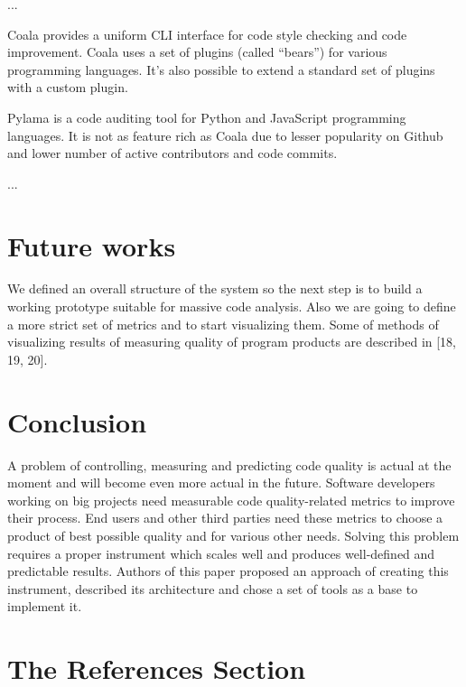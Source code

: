 \documentclass[runningheads,a4paper]{llncs}
\begin{document}
...

Coala provides a uniform CLI interface for code style checking and code
improvement. Coala uses a set of plugins (called “bears”) for various
programming languages. It’s also possible to extend a standard set of
plugins with a custom plugin.

Pylama is a code auditing tool for Python and JavaScript programming
languages. It is not as feature rich as Coala due to lesser popularity
on Github and lower number of active contributors and code commits.

...

\section{Future works}

We defined an overall structure of the system so the next step is
to build a working prototype suitable for massive code analysis. Also
we are going to define a more strict set of metrics and to start
visualizing them. Some of methods of visualizing results of measuring
quality of program products are described in [18, 19, 20].

\section{Conclusion}

A problem of controlling, measuring and predicting code quality is actual
at the moment and will become even more actual in the future. Software
developers working on big projects need measurable code quality-related
metrics to improve their process. End users and other third parties need
these metrics to choose a product of best possible quality and for various
other needs. Solving this problem requires a proper instrument which scales
well and produces well-defined and predictable results. Authors of this paper
proposed an approach of creating this instrument, described its architecture
and chose a set of tools as a base to implement it.

\section{The References Section}\label{references}
\end{document}

